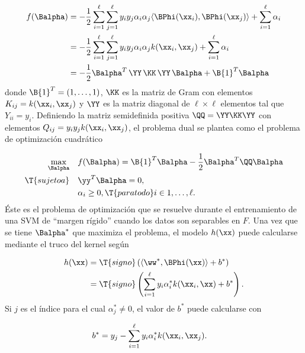 \begin{align}
  f(\Balpha)
  & = -\frac{1}{2}\sum_{i=1}^\ell\sum_{j=1}^\ell
    y_iy_j\alpha_i\alpha_j \langle \BPhi(\xx_i),\BPhi(\xx_j) \rangle +
    \sum_{i=1}^{\ell} \alpha_i \notag\\
  & = -\frac{1}{2}\sum_{i=1}^\ell\sum_{j=1}^\ell
    y_iy_j\alpha_i\alpha_j k(\xx_i,\xx_j) + \sum_{i=1}^{\ell} \alpha_i
    \notag \\
  & = -\frac{1}{2}\Balpha^T\,\YY\,\KK\,\YY\,\Balpha
    + \B{1}^T\Balpha  
\end{align}
donde $\B{1}^T=(1,\ldots,1)$, $\KK$ es la matriz de Gram con elementos
$K_{ij}=k(\xx_i,\xx_j)$ y $\YY$ es la matriz diagonal de
$\ell\times\ell$ elementos tal que $Y_{ii}=y_i$.
Definiendo la matriz semidefinida positiva $\QQ=\YY\KK\YY$ con elementos
$Q_{ij}=y_iy_jk(\xx_i,\xx_j)$, el problema dual se plantea como
el problema de optimización cuadrático

\begin{align}
\begin{split}
    \max_{\Balpha} \quad
    & f(\Balpha) = \B{1}^T\Balpha-\frac{1}{2}\Balpha^T\QQ\Balpha\\
    \T{sujeto a}\quad & \yy^T\Balpha = 0, \\
                      & \alpha_i\geq 0, \T{ para todo } i\in {1,\ldots,\ell }.
\end{split}\end{align}
Éste es el problema de optimización que se resuelve durante el
entrenamiento de una SVM de ``margen rígido'' cuando los datos son
separables en $F$. Una vez que se tiene $\Balpha^*$ que maximiza el problema,
el modelo $h(\xx)$ puede calcularse mediante el truco del kernel según

\begin{align}
  \begin{split}
    h(\xx) &= \T{signo}\left(\langle\ww^*,\BPhi(\xx)\rangle+b^*\right)\\
    &= \T{signo}\left(\sum_{i=1}^\ell{}y_i\alpha^*_ik(\xx_i,\xx)+b^*\right).
  \end{split}
\label{eq:svm-model-hard}
\end{align}
Si $j$ es el índice para el cual $\alpha^*_j\neq0$, el valor de $b^*$
puede calcularse con

\begin{align}
    b^* &= y_j - \sum_{i=1}^\ell{}y_i\alpha^*_ik(\xx_i,\xx_j).
\end{align}

